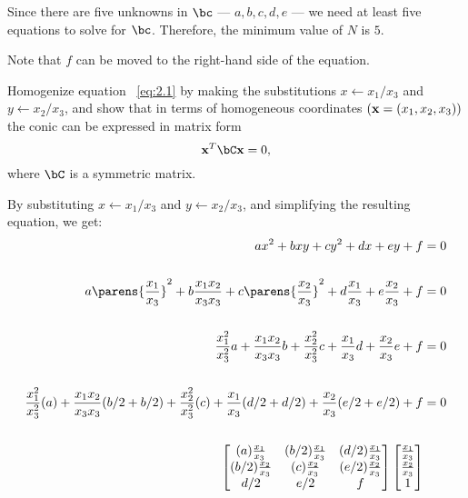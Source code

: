 \begin{problem}
\begin{enumalph}
\begin{answer}
        Since there are five unknowns in $\bc$ ---
        $a, b, c, d, e$ --- we need at least five equations
        to solve for $\bc$.
        Therefore, the minimum value of $N$ is $5$.

        Note that $f$ can
        be moved to the right-hand side of the equation.
      \end{answer}

    \newpage
    \item Homogenize equation ~\ref{eq:2.1} by making the
      substitutions $x \gets x_1/x_3$ and $y \gets x_2/x_3$,
      and show that in terms of homogeneous coordinates
      $(\mathbf{x} = (x_1, x_2, x_3))$ the conic can be expressed in
      matrix form
      \[ \bx^T\bC\bx = 0, \]
      where $\bC$ is a symmetric matrix.
      \begin{answer}
        By substituting $x \gets x_1/x_3$ and $y \gets x_2/x_3$,
        and simplifying the resulting equation, we get:
        \begin{align*}
          ax^2 + bxy + cy^2 + dx + ey + f &= 0 \\ \\
          a\parens{\frac{x_1}{x_3}}^2 + b\frac{x_1x_2}{x_3x_3}
          + c\parens{\frac{x_2}{x_3}}^2
          + d\frac{x_1}{x_3} + e\frac{x_2}{x_3} + f &= 0 \\ \\
          \frac{x_1^2}{x_3^2}a + \frac{x_1x_2}{x_3x_3}b
          + \frac{x_2^2}{x_3^2}c
          + \frac{x_1}{x_3}d + \frac{x_2}{x_3}e + f &= 0 \\ \\
          \frac{x_1^2}{x_3^2}(a) + \frac{x_1x_2}{x_3x_3}(b/2 + b/2)
          + \frac{x_2^2}{x_3^2}(c) + \frac{x_1}{x_3}(d/2 + d/2)
          + \frac{x_2}{x_3}(e/2 + e/2) + f &= 0 \\ \\
          \begin{bmatrix}
            (a) \frac{x_1}{x_3} & (b/2) \frac{x_1}{x_3} & (d/2) \frac{x_1}{x_3} \\
            (b/2) \frac{x_2}{x_3} & (c) \frac{x_2}{x_3} & (e/2) \frac{x_2}{x_3} \\
            d/2 & e/2 & f \\
          \end{bmatrix}
          \begin{bmatrix}
            \frac{x_1}{x_3} \\
            \frac{x_2}{x_3} \\
            1 \\

\end{bmatrix}
\end{align*}
\end{answer}
\end{enumalph}
\end{problem}
